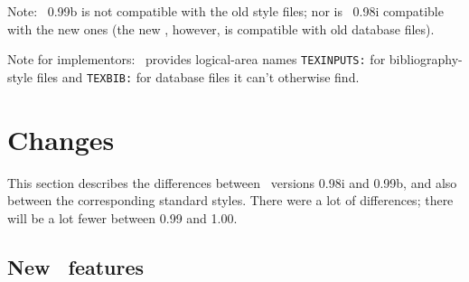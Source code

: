 Note: \BibTeX\ 0.99b is not compatible with the old style files;
nor is \BibTeX\ 0.98i compatible with the new ones
(the new \BibTeX, however, is compatible with old database files).

Note for implementors: \BibTeX\ provides logical-area names
\hbox{\tt TEXINPUTS:} for bibliography-style files and
\hbox{\tt TEXBIB:} for database files it can't otherwise find.


\section{Changes}
\label{differences}

This section describes the differences between
\BibTeX\ versions 0.98i and 0.99b, and also between
the corresponding standard styles.
There were a lot of differences;
there will be a lot fewer between 0.99 and 1.00.


\subsection{New \BibTeX\ features}
\label{features}

